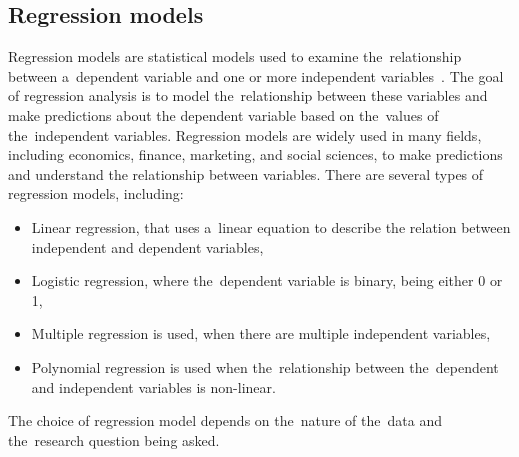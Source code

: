         \subsection{Regression models}
        Regression models are  statistical models used to examine the~relationship
        between a~dependent variable and one or more independent variables~\cite{Fahrmeir}.
        The goal of regression analysis is to model the~relationship between these variables
        and make predictions about the dependent variable based on the~values of
        the~independent variables. Regression models are widely used in many fields,
        including economics, finance, marketing, and social sciences, to make predictions
        and understand the relationship between variables. There are several types of
        regression models, including:
        \begin{itemize}
            \item Linear regression, that uses a~linear equation to describe the relation
            between independent and dependent variables,
            \item Logistic regression, where
            the~dependent variable is binary, being either 0 or 1,
            \item Multiple regression is used, when there are multiple independent variables,
            \item Polynomial regression is used when the~relationship between the~dependent
            and independent variables is non-linear.
        \end{itemize}

        The choice of regression model depends on the~nature of the~data and
        the~research question being asked.
        
